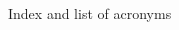 \documentclass[11pt,letterpaper,twoside,openany]{boek3}
\begin{document}
 {Index and list of acronyms}

\def\acitem#1#2{\item[#1]{#2}\index{#1|see{#2}}}
\def\acitemi#1#2#3{\item[#1]{#2}\index{#1|see{#3}}}


\begin{multicols}{2}
\begin{description}


\end{description}
\end{multicols}
\end{document}
